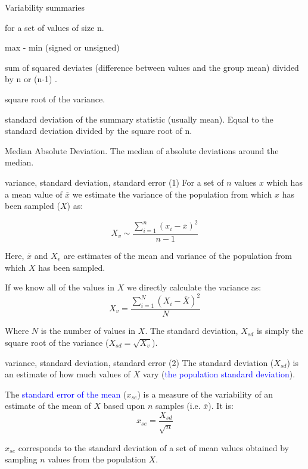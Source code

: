 \documentclass[pdf]{beamer}
\begin{document}
\begin{frame}{Variability summaries}

for a set of values of size n.

\begin{description} \pause
\item[range] max - min (signed or unsigned) \pause
\item[variance] sum of squared deviates (difference between values and the
  group mean) divided by n or (n-1) .\pause
\item[standard deviation] square root of the variance. \pause
\item[standard error] standard deviation of the summary statistic (usually
  mean). Equal to the standard deviation divided by the square root of n. \pause
\item[MAD] Median Absolute Deviation. The median of absolute deviations around
  the median.
\end{description}
\end{frame}

\begin{frame}{variance, standard deviation, standard error (1)}
  \small
  For a set of $n$ values $x$
  which has a mean value of $\overline{x}$
  we estimate the variance of the population from which $x$ has been
  sampled ($X$) as:
  
  $$ X_v \sim \frac{\sum_{i=1}^{n}{(x_i - \overline{x})^2}}{n-1} $$ 
  
  Here, $\overline{x}$ and $X_v$ are estimates of the 
  mean and variance of the population from which $X$ has
  been sampled.

  If we know all of the values in $X$ we directly calculate the variance as:
  $$X_v = \frac{\sum_{i=1}^{N}{(X_i - \overline{X})^2}}{N} $$ 

  Where $N$ is the number of values in $X$. The standard deviation, $X_{sd}$
  is simply the square root of the variance ($X_{sd} = \sqrt{X_v}$).
\end{frame}

\begin{frame}{variance, standard deviation, standard error (2)}
  The standard deviation ($X_{sd}$) is an estimate of how much values of
  $X$ vary (\textcolor{blue}{the population standard deviation}). 

  The \textcolor{blue}{standard error of the mean} ($x_{se}$) 
  is a measure of the variability of an estimate of
  the mean of $X$ based upon $n$ samples (i.e. $\overline{x}$). It is:
  $$ x_{se} = \frac{X_{sd}}{\sqrt{n}} $$

  $x_{se}$ corresponds to the standard deviation of a set of mean values
  obtained by sampling $n$ values from the population $X$.
\end{frame}
\end{document}
